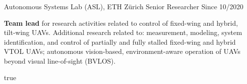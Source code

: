 \label{sec:exp}


\begin{cventries}

\cvexpentry
  	{Autonomous Systems Lab (ASL), ETH Z\"{u}rich} %
  	{Senior Researcher} %
    {} %
    {Since 10/2020} %
    {
      \begin{cvitems} %
      	\item \textbf{Team lead} for research activities related to control of fixed-wing and hybrid, tilt-wing UAVs. Additional research related to: measurement, modeling, system identification, and control of partially and fully stalled fixed-wing and hybrid VTOL UAVs; autonomous vision-based, environment-aware operation of UAVs beyond visual line-of-sight (BVLOS). %
      \end{cvitems}
    } %
    {} %
    {true}
    {}


\end{cventries}

